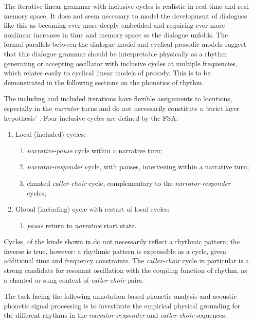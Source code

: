 \documentclass[output=paper,colorlinks,citecolor=brown]{langscibook}
\begin{document}
The iterative linear grammar with inclusive cycles is realistic in real time and real memory space. It does not seem necessary to model the development of  dialogues like this as becoming ever more deeply embedded and requiring ever more nonlinear increases in time and memory space as the dialogue unfolds. The formal parallels between the dialogue model and cyclical prosodic models suggest that this dialogue grammar should be interpretable physically as a rhythm generating or accepting oscillator with inclusive cycles at multiple frequencies, which relates easily to cyclical linear models of prosody. This is to be demonstrated in the following sections on the phonetics of rhythm.

The including and included iterations have flexible assignments to locutions, especially in the \textit{narrator} turns and do not necessarily constitute a `strict layer hypothesis' \citep{selkirk1984}. Four inclusive cycles are defined by the FSA:

\begin{enumerate} %
\item Local (included) cycles:
	\begin{enumerate} \itemsep -5pt
	\item[] \textit{narrative-pause} cycle within a narrative turn;
	\item[] \textit{narrator-responder} cycle, with pauses, intervening within a narrative turn;
	\item[] chanted \textit{caller-choir} cycle, complementary to the \textit{narrator-responder} cycles;
	\end{enumerate}
\item Global (including) cycle with restart of local cycles:
	\begin{enumerate} %
	\item[] \textit{pause} return to \textit{narrative} start state.
	\end{enumerate}
\end{enumerate}

Cycles, of the kinds shown in  do not necessarily reflect a rhythmic pattern; the inverse is true, however: a rhythmic pattern is expressible as a cycle, given additional time and frequency constraints. The \textit{caller-choir} cycle in particular is a strong candidate for resonant oscillation with the coupling function of rhythm, as a chanted or sung context of \textit{caller-choir} pairs.

The task facing the following annotation-based phonetic analysis and acoustic phonetic signal processing is to investivate the empirical physical grounding for the different rhythms in the \textit{narrator-responder} and \textit{caller-choir} sequences.
\end{document}
